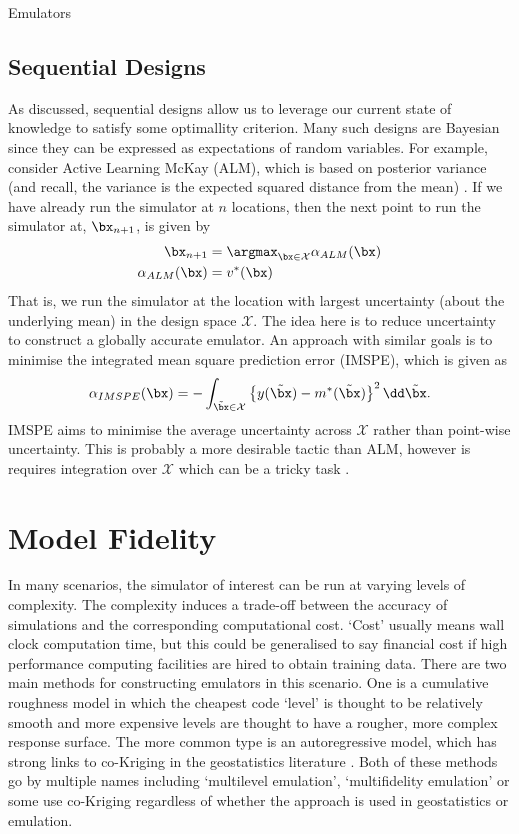 \begin{chapter}{Emulators \label{Ch:Emulators}}
\subsection{Sequential Designs}
As discussed, sequential designs allow us to leverage our current state of knowledge to satisfy some optimallity criterion. Many such designs are Bayesian since they can be expressed as expectations of random variables. For example, consider Active Learning McKay (ALM), which is based on posterior variance (and recall, the variance is the expected squared distance from the mean) \citep{Seo2000}. If we have already run the simulator at $n$ locations, then the next point to run the simulator at, $\bx_{n+1}$, is given by
\begin{align}
  \bx_{n+1} &= \argmax_{\bx \in \mathcal{X}} \alpha_{ALM}(\bx)\\
    \alpha_{ALM}(\bx) &= v^{*}(\bx)
\end{align}
That is, we run the simulator at the location with largest uncertainty (about the underlying mean) in the design space $\mathcal{X}$. The idea here is to reduce uncertainty to construct a globally accurate emulator. An approach with similar goals is to minimise the integrated mean square prediction error (IMSPE), which is given as
\begin{equation}
  \alpha_{IMSPE}(\bx) =  -  \int_{\tilde{\bx} \in \mathcal{X}} \left\{ y(\tilde{\bx}) - m^* (\tilde{\bx}) \right\} ^2 \dd \tilde{\bx}.
\end{equation}
IMSPE aims to minimise the average uncertainty across $\mathcal{X}$ rather than point-wise uncertainty. This is probably a more desirable tactic than ALM, however is requires integration over $\mathcal{X}$ which can be a tricky task \citep{Gramacy2020surrogates}.
\section{Model Fidelity}
In many scenarios, the simulator of interest can be run at varying levels of complexity. The complexity induces a trade-off between the accuracy of simulations and the corresponding computational cost. `Cost' usually means wall clock computation time, but this could be generalised to say financial cost if high performance computing facilities are hired to obtain training data.
There are two main methods for constructing emulators in this scenario. One is a cumulative roughness model in which the cheapest code `level' is thought to be relatively smooth and more expensive levels are thought to have a rougher, more complex response surface. The more common type is an autoregressive model, which has strong links to co-Kriging in the geostatistics literature \citep{Stein1991}. Both of these methods go by multiple names including `multilevel emulation', `multifidelity emulation' or some use co-Kriging regardless of whether the approach is used in geostatistics or emulation.


\end{chapter}
